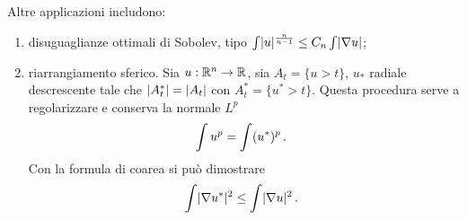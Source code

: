 Altre applicazioni includono:
\begin{enumerate}
	\item disuguaglianze ottimali di Sobolev, tipo $\int \lvert u\rvert^{\frac n{n-1}} \le C_n \int \lvert\nabla u\rvert$;
	
	\item riarrangiamento sferico. Sia $u:\mathbb R^n\to \mathbb R$, sia $A_t = \{ u> t \}$, $u_*$ radiale descrescente tale che $\lvert A_t^*\rvert = \lvert A_t\rvert$ con $A_t^* = \{u^*>t\}$. Questa procedura serve a regolarizzare e conserva la normale $L^p$
	\begin{equation*}
		\int u^p = \int (u^*)^p \, \text{. }
	\end{equation*}
	Con la formula di coarea si può dimostrare
	\begin{equation*}
		\int \lvert\nabla u^*\rvert^2 \le \int \lvert\nabla u\rvert^2 \, \text{. }
	\end{equation*}
	
\end{enumerate}







